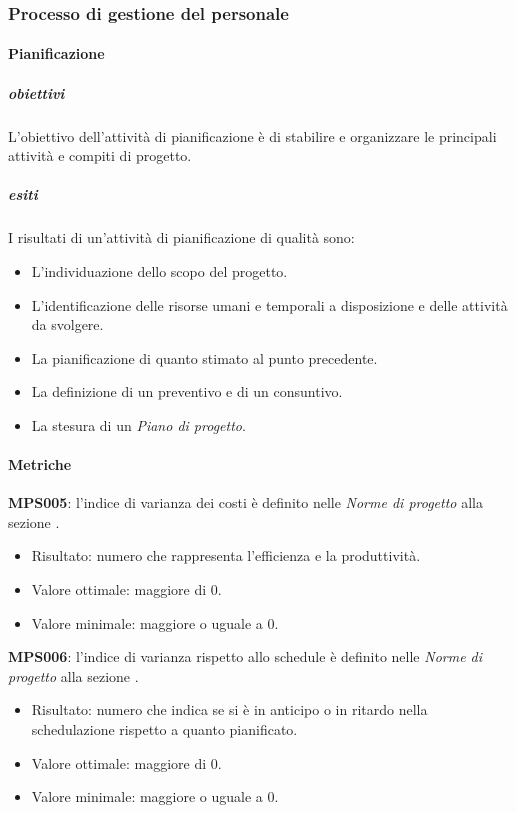 \documentclass[../piano-di-qualifica.tex]{subfiles}
\begin{document}
\subsubsection{Processo di gestione del personale}%
\label{subs:processo_di_gestione_del_personale}

\paragraph{Pianificazione}%
\label{par:pianificazione}

\subparagraph{obiettivi}%
\label{subp:obiettivi}
L'obiettivo dell'attività di pianificazione è di stabilire e organizzare le principali attività e compiti di progetto.

\subparagraph{esiti}%
\label{subp:esiti}
I risultati di un'attività di pianificazione di qualità sono:
\begin{itemize}
  \item L'individuazione dello scopo del progetto.
  \item L'identificazione delle risorse umani e temporali a disposizione e delle attività da svolgere.
  \item La pianificazione di quanto stimato al punto precedente.
  \item La definizione di un preventivo e di un consuntivo.
  \item La stesura di un \textit{Piano di progetto}.
\end{itemize}

\paragraph{Metriche}%
\label{par:metriche}

\textbf{MPS005}: l'indice di varianza dei costi è definito nelle \textit{Norme di progetto} alla sezione .
\begin{itemize}
  \item Risultato: numero che rappresenta l'efficienza e la produttività.
  \item Valore ottimale: maggiore di 0.
  \item Valore minimale: maggiore o uguale a 0.
\end{itemize}

\textbf{MPS006}: l'indice di varianza rispetto allo schedule è definito nelle \textit{Norme di progetto} alla sezione .
\begin{itemize}
  \item Risultato: numero che indica se si è in anticipo o in ritardo nella schedulazione rispetto a quanto pianificato.
  \item Valore ottimale: maggiore di 0.
  \item Valore minimale: maggiore o uguale a 0.
\end{itemize}
\end{document}
